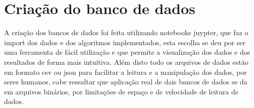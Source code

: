 \section{Criação do banco de dados}

A criação dos bancos de dados foi feita utilizando notebooks juypter, que faz o import dos dados e dos algoritmos implementados,
esta escolha se deu por ser uma ferramenta de fácil utilização e que permite a visualização dos dados e dos resultados de forma mais intuitiva.
Além disto todo os arquivos de dados estão em formato csv ou json para facilitar a leitura e a manipulação dos dados, por seres humanos,
cabe ressaltar que aplicação real de dais bancos de dados se da em arquivos binários, por limitações de espaço e de velocidade de leitura de dados.

